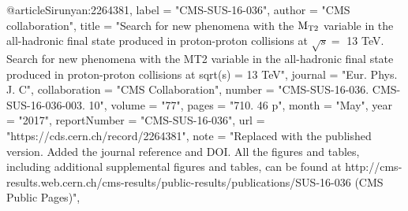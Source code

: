 @article{Sirunyan:2264381,
      label          = "CMS-SUS-16-036",
      author        = "{CMS collaboration}",
      title         = "{Search for new phenomena with the $ \mathrm{ M_{\rm T2} }
                       $ variable in the all-hadronic final state produced in
                       proton-proton collisions at $\sqrt{s} = $ 13 TeV. Search
                       for new phenomena with the MT2 variable in the all-hadronic
                       final state produced in proton-proton collisions at sqrt(s)
                       = 13 TeV}",
      journal       = "Eur. Phys. J. C",
      collaboration = "CMS Collaboration",
      number        = "CMS-SUS-16-036. CMS-SUS-16-036-003. 10",
      volume        = "77",
      pages         = "710. 46 p",
      month         = "May",
      year          = "2017",
      reportNumber  = "CMS-SUS-16-036",
      url           = "https://cds.cern.ch/record/2264381",
      note          = "Replaced with the published version. Added the journal
                       reference and DOI. All the figures and tables, including
                       additional supplemental figures and tables, can be found at
                       http://cms-results.web.cern.ch/cms-results/public-results/publications/SUS-16-036
                       (CMS Public Pages)",
}

